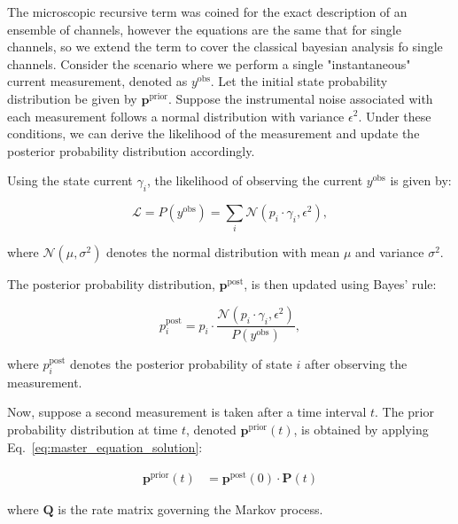 \documentclass[pdflatex,sn-mathphys-num]{sn-jnl}%
\theoremstyle{thmstyleone}%
\theoremstyle{thmstyletwo}%
\theoremstyle{thmstylethree}%
\begin{document}
The microscopic recursive term was coined for the exact description of an ensemble of channels, however the equations are the same that for single channels, so we extend the term to cover the classical bayesian analysis fo single channels. 
Consider the scenario where we perform a single "instantaneous" current measurement, denoted as \( y^{\text{obs}} \). Let the initial state probability distribution be given by \( \boldsymbol{p}^{\text{prior}} \). Suppose the instrumental noise associated with each measurement follows a normal distribution with variance \( \epsilon^2 \). Under these conditions, we can derive the likelihood of the measurement and update the posterior probability distribution accordingly.

Using the state current $\gamma_i$, the likelihood of observing the current \( y^{\text{obs}} \) is given by:

\begin{equation}
	\mathcal{L} = P(y^{\text{obs}}) = \sum_i \mathcal{N}(p_i \cdot \gamma_i, \epsilon^2),
	\label{eq:single_channel_likelihood}
\end{equation}

where \( \mathcal{N}(\mu, \sigma^2) \) denotes the normal distribution with mean \( \mu \) and variance \( \sigma^2 \).

The posterior probability distribution, \( \boldsymbol{p}^{\text{post}} \), is then updated using Bayes' rule:

\begin{equation}
	p^{\text{post}}_i = p_i \cdot \frac{\mathcal{N}(p_i \cdot \gamma_i, \epsilon^2)}{P(y^{\text{obs}})},
	\label{eq:single_channel_posterior}
\end{equation}

where \( p^{\text{post}}_i \) denotes the posterior probability of state \( i \) after observing the measurement.

Now, suppose a second measurement is taken after a time interval \( t \). The prior probability distribution at time \( t \), denoted \( \boldsymbol{p}^{\text{prior}}(t) \), is obtained by applying Eq.~\ref{eq:master_equation_solution}:

\begin{align}
	\boldsymbol{p}^{\text{prior}}(t) &= \boldsymbol{p}^{\text{post}}(0) \cdot \boldsymbol{P}(t)
	\label{eq:prior_update}
\end{align}

where \( \boldsymbol{Q} \) is the rate matrix governing the Markov process.
\end{document}
